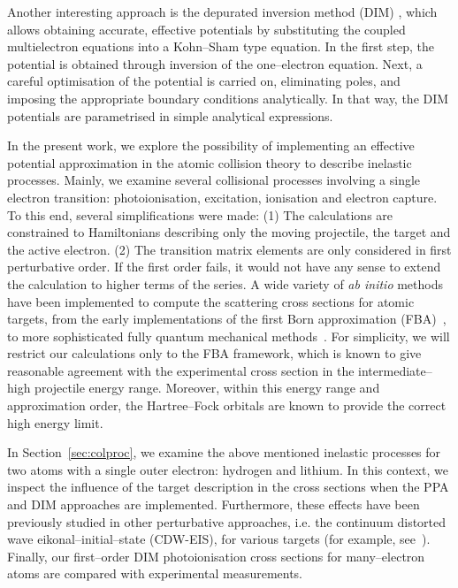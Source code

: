\documentclass[10pt]{article}
\begin{document}
Another interesting approach is the depurated inversion method 
(DIM) \cite{Mendez2015,Mendez2016,Mendez2018}, which allows
obtaining accurate, effective potentials by substituting the coupled 
multielectron equations into a Kohn--Sham type equation. 
In the first step, the potential is obtained through inversion of the 
one--electron equation. Next, a careful optimisation of the potential is 
carried on, eliminating poles, and imposing the appropriate boundary 
conditions analytically. In that way, the DIM potentials are parametrised 
in simple analytical expressions.

In the present work, we explore the possibility of implementing an 
effective potential approximation in the atomic collision theory to 
describe inelastic processes. Mainly, we examine several collisional 
processes involving 
a single electron transition: photoionisation, excitation, ionisation 
and electron capture. To this end, several simplifications were made: 
(1) The calculations are constrained to Hamiltonians describing only
the moving projectile, the target and the active 
electron. (2) The transition matrix elements are only considered in  
first perturbative order. If the first order fails, it would not have 
any sense to extend the calculation to higher terms of the series.
A wide variety of {\it ab initio} methods have been 
implemented to compute the scattering cross sections for atomic targets, 
from the early implementations of the first Born 
approximation (FBA)~\cite{BatesBook,McDowell1961}, to more sophisticated
fully quantum mechanical methods~\cite{Pindzola2007,Burke2011,Bray2017,Pindzola2016}. 
For simplicity, we will restrict our calculations only to the FBA framework, 
which is known to give reasonable agreement with 
the experimental cross section in the intermediate--high projectile 
energy range. Moreover, within this energy range and approximation 
order, the Hartree--Fock orbitals are known to provide the correct 
high energy limit.

In Section~\ref{sec:colproc}, we examine the above mentioned 
inelastic processes for two atoms with a single outer electron: 
hydrogen and lithium. 
In this context, we inspect the influence of the target description 
in the cross sections when the PPA and DIM approaches are implemented. 
Furthermore, these effects have been previously studied in other 
perturbative approaches, i.e. the continuum distorted wave 
eikonal--initial--state (CDW-EIS), for various targets (for example,
see~\cite{Kirchner1998,Fiori2001}).
Finally, our first--order DIM photoionisation cross sections for 
many--electron atoms are compared with experimental measurements. 
\end{document}
